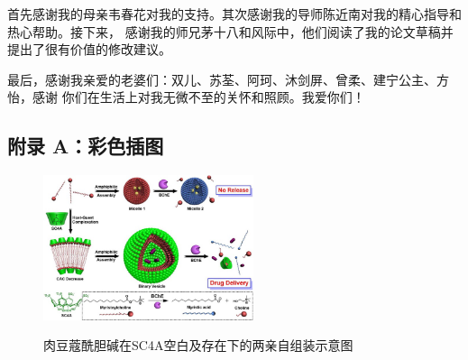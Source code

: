 \documentclass[bachelor,adobefonts]{jnuthesis} %
\begin{document}
    \begin{acknowledgement}
        首先感谢我的母亲韦春花对我的支持。其次感谢我的导师陈近南对我的精心指导和热心帮助。接下来，
        感谢我的师兄茅十八和风际中，他们阅读了我的论文草稿并提出了很有价值的修改建议。
        
        最后，感谢我亲爱的老婆们：双儿、苏荃、阿珂、沐剑屏、曾柔、建宁公主、方怡，感谢
        你们在生活上对我无微不至的关怀和照顾。我爱你们！
    \end{acknowledgement}
    \begin{backmatter}
    \chapter{附录 A：彩色插图}
    \begin{figure}[htbp]
        \centering
        \includegraphics[width= 0.55\textwidth]{Figure/Ch1-SC4A}\\
        \caption{肉豆蔻酰胆碱在SC4A空白及存在下的两亲自组装示意图}
    \end{figure}
    \end{backmatter}
\end{document}
